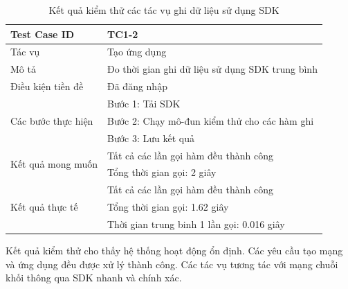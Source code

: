 \documentclass[../DoAn.tex]{subfiles}
\begin{document}
\begingroup
\renewcommand{\arraystretch}{1.5} %
\begin{table}[H]
    \centering
    \def\arraystretch{1.5}
    \caption{Kết quả kiểm thử các tác vụ ghi dữ liệu sử dụng SDK}
    \label{tab:TestSDKWrite}
    \begin{tabular}{|p{}|p{}|}
        \hline
        Test Case ID                                       & TC1-2                                           \\ \hline
        Tác vụ                                             & Tạo ứng dụng                                    \\ \hline
        Mô tả                                              & Đo thời gian ghi dữ liệu sử dụng SDK trung bình \\ \hline
        Điều kiện tiền đề                                  & Đã đăng nhập                                    \\ \hline
        \multirow[t]{3}{0.3\textwidth}{Các bước thực hiện} & Bước 1: Tải SDK                                 \\
                                                           & Bước 2: Chạy mô-đun kiểm thử cho các hàm ghi    \\
                                                           & Bước 3: Lưu kết quả                             \\ \hline
        \multirow[t]{2}{0.3\textwidth}{Kết quả mong muốn}  & Tất cả các lần gọi hàm đều thành công           \\
                                                           & Tổng thời gian gọi: 2 giây                      \\ \hline
        \multirow[t]{3}{0.3\textwidth}{Kết quả thực tế}    & Tất cả các lần gọi hàm đều thành công           \\
                                                           & Tổng thời gian gọi: 1.62 giây                   \\
                                                           & Thời gian trung binh 1 lần gọi: 0.016 giây      \\ \hline
    \end{tabular}
\end{table}
\endgroup

Kết quả kiểm thử cho thấy hệ thống hoạt động ổn định. Các yêu cầu tạo mạng và
ứng dụng đều được xử lý thành công. Các tác vụ tương tác với mạng chuỗi khối
thông qua SDK nhanh và chính xác.
\end{document}
